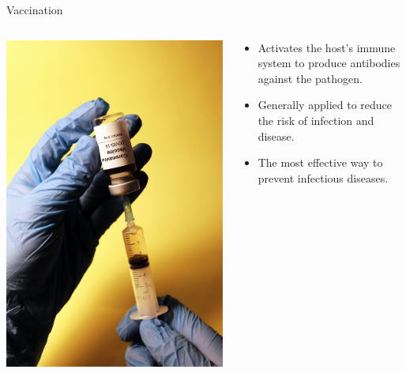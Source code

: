 \documentclass[
  ignorenonframetext,
]{beamer}
\providecommand{\tightlist}{%
  \setlength{\itemsep}{0pt}\setlength{\parskip}{0pt}}\usepackage{longtable,booktabs,array}
\begin{document}
\begin{frame}
\begin{block}{Vaccination}
\label{sec-vaccination}
\begin{columns}[T]
\begin{column}{0.4\textwidth}
\includegraphics{images/vaccine.jpeg}
\end{column}

\begin{column}{0.6\textwidth}
\begin{itemize}
\tightlist
\item
  Activates the host's immune system to produce antibodies against the
  pathogen.
\item
  Generally applied to reduce the risk of infection and disease.
\item
  The most effective way to prevent infectious diseases.
\end{itemize}
\end{column}
\end{columns}
\end{block}
\end{frame}
\end{document}
